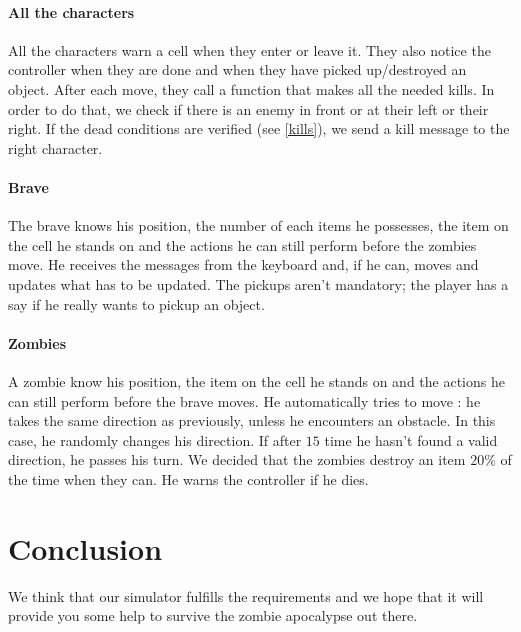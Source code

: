 \documentclass[11pt,a4paper]{article}
\begin{document}
\paragraph{All the characters}
All the characters warn a cell when they enter or leave it. They also notice the controller when they are done and when they have picked up/destroyed an object. After each move, they call a function that makes all the needed kills. In order to do that, we check if there is an enemy in front or at their left or their right. If the dead conditions are verified (see \ref{kills}), we send a kill message to the right character. 

\paragraph{Brave}
The brave knows his position, the number of each items he possesses, the item on the cell he stands on and the actions he can still perform before the zombies move. He receives the messages from the keyboard and, if he can, moves and updates what has to be updated. The pickups aren't mandatory; the player has a say if he really wants to pickup an object.

\paragraph{Zombies}
A zombie know his position, the item on the cell he stands on and the actions he can still perform before the brave moves. He automatically tries to move : he takes the same direction as previously, unless he encounters an obstacle. In this case, he randomly changes his direction. If after $15$ time he hasn't found a valid direction, he passes his turn. We decided that the zombies destroy an item $20\%$ of the time when they can. He warns the controller if he dies. 
    
\section*{Conclusion}
We think that our simulator fulfills the requirements and we hope that it will provide you some help to survive the zombie apocalypse out there.
    
\end{document}
